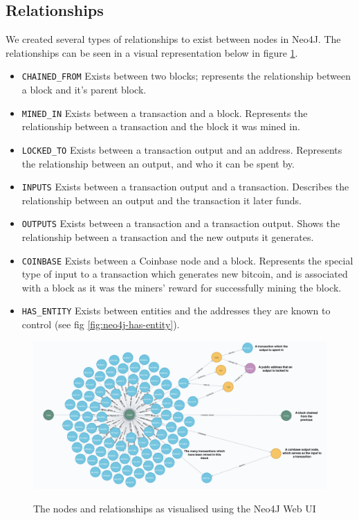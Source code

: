 \subsection{Relationships}
We created several types of relationships to exist between nodes in Neo4J. The relationships can be seen in a visual representation below in figure \ref{fig:neo4j-layout}.
\begin{itemize}
    \item \texttt{CHAINED\_FROM} Exists between two blocks; represents the relationship between a block and it's parent block. 
    \item \texttt{MINED\_IN} Exists between a transaction and a block. Represents the relationship between a transaction and the block it was mined in. 
    \item \texttt{LOCKED\_TO} Exists between a transaction output and an address. Represents the relationship between an output, and who it can be spent by. 
    \item \texttt{INPUTS} Exists between a transaction output and a transaction. Describes the relationship between an output and the transaction it later funds. 
    \item \texttt{OUTPUTS} Exists between a transaction and a transaction output. Shows the relationship between a transaction and the new outputs it generates. 
    \item \texttt{COINBASE} Exists between a Coinbase node and a block. Represents the special type of input to a transaction which generates new bitcoin, and is associated with a block as it was the miners' reward for successfully mining the block. 
    \item \texttt{HAS\_ENTITY} Exists between entities and the addresses they are known to control (see fig \ref{fig:neo4j-has-entity}).
\end{itemize}

\begin{figure}[h!]
  \centering
  \includegraphics[width = 15cm]{./figures/neo4j-annotated}\\[0.5cm] 
  \caption{The nodes and relationships as visualised using the Neo4J Web UI}
  \label{fig:neo4j-layout}
\end{figure}

